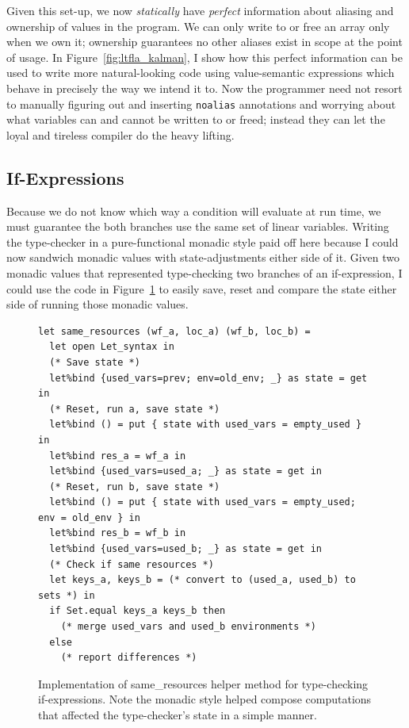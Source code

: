Given this set-up, we now \emph{statically} have \emph{perfect} information
about aliasing and ownership of values in the program. We can only write to or
free an array only when we own it; ownership guarantees no other aliases exist
in scope at the point of usage. In Figure~\ref{fig:ltfla_kalman}, I show how
this perfect information can be used to write more natural-looking code using
value-semantic expressions which behave in precisely the way we intend it to.
Now the programmer need not resort to manually figuring out and inserting
\texttt{noalias} annotations and worrying about what variables can and cannot
be written to or freed; instead they can let the loyal and tireless compiler do
the heavy lifting.

\subsection{If-Expressions}

Because we do not know which way a condition will evaluate at run time, we must
guarantee the both branches use the same set of linear variables. Writing the
type-checker in a pure-functional monadic style paid off here because I could
now sandwich monadic values with state-adjustments either side of it. Given two
monadic values that represented type-checking two branches of an if-expression,
I could use the code in Figure~\ref{fig:same_resources} to easily save, reset
and compare the state either side of running those monadic values.

\begin{figure}[tp]
    \begin{verbatim}
let same_resources (wf_a, loc_a) (wf_b, loc_b) =
  let open Let_syntax in
  (* Save state *)
  let%bind {used_vars=prev; env=old_env; _} as state = get in
  (* Reset, run a, save state *)
  let%bind () = put { state with used_vars = empty_used } in
  let%bind res_a = wf_a in
  let%bind {used_vars=used_a; _} as state = get in
  (* Reset, run b, save state *)
  let%bind () = put { state with used_vars = empty_used; env = old_env } in
  let%bind res_b = wf_b in
  let%bind {used_vars=used_b; _} as state = get in
  (* Check if same resources *)
  let keys_a, keys_b = (* convert to (used_a, used_b) to sets *) in
  if Set.equal keys_a keys_b then
    (* merge used_vars and used_b environments *)
  else
    (* report differences *)
    \end{verbatim}

    \caption{Implementation of same\_resources helper method for type-checking
        if-expressions. Note the monadic style helped compose computations that
        affected the type-checker's state in a simple manner.}\label{fig:same_resources}

\end{figure}

